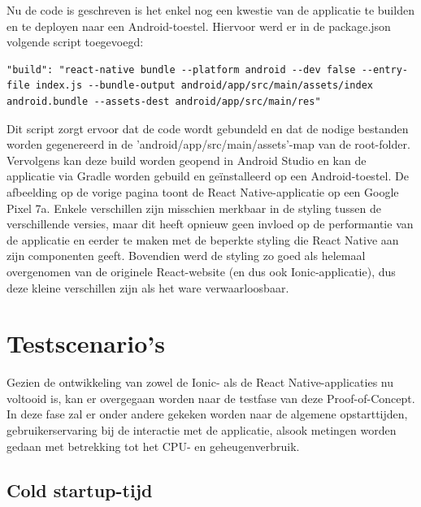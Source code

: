 Nu de code is geschreven is het enkel nog een kwestie van de applicatie te builden en te deployen naar een Android-toestel. Hiervoor werd er in de package.json volgende script toegevoegd:

\begin{mdframed}[backgroundcolor=bg]
  \begin{verbatim}
"build": "react-native bundle --platform android --dev false --entry-file index.js --bundle-output android/app/src/main/assets/index android.bundle --assets-dest android/app/src/main/res"
  \end{verbatim}
\end{mdframed}


Dit script zorgt ervoor dat de code wordt gebundeld en dat de nodige bestanden worden gegenereerd in de 'android/app/src/main/assets'-map van de root-folder. Vervolgens kan deze build worden geopend in Android Studio en kan de applicatie via Gradle worden gebuild en geïnstalleerd op een Android-toestel. De afbeelding op de vorige pagina toont de React Native-applicatie op een Google Pixel 7a. Enkele verschillen zijn misschien merkbaar in de styling tussen de verschillende versies, maar dit heeft opnieuw geen invloed op de performantie van de applicatie en eerder te maken met de beperkte styling die React Native aan zijn componenten geeft. Bovendien werd de styling zo goed als helemaal overgenomen van de originele React-website (en dus ook Ionic-applicatie), dus deze kleine verschillen zijn als het ware verwaarloosbaar.

\section{Testscenario's}
\label{sec:testscenario}

Gezien de ontwikkeling van zowel de Ionic- als de React Native-applicaties nu voltooid is, kan er overgegaan worden naar de testfase van deze Proof-of-Concept. In deze fase zal er onder andere gekeken worden naar de algemene opstarttijden, gebruikerservaring bij de interactie met de applicatie, alsook metingen worden gedaan met betrekking tot het CPU- en geheugenverbruik.


\subsection{Cold startup-tijd}
\label{subsec:cold-startup-tijd}

